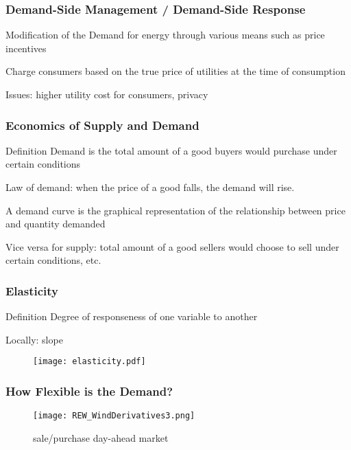 \documentclass[10pt,aspectratio=169,dvipsnames]{beamer}
\begin{document}
\begin{frame}
  \frametitle{Demand-Side Management / Demand-Side Response}

  Modification of the Demand for energy through various means such as price incentives

  Charge consumers based on the true price of utilities at the time of consumption

  Issues: higher utility cost for consumers, privacy

\end{frame}


\begin{frame}
 \frametitle{Economics of Supply and Demand}
 \begin{block}{Definition}
  Demand is the total amount of a good buyers would purchase under certain conditions
 \end{block}

 Law of demand: when the price of a good falls, the demand will rise.

 A demand curve is the graphical representation of the relationship between price and quantity demanded

 Vice versa for supply: total amount of a good sellers would choose to sell under certain conditions, etc.
\end{frame}

\begin{frame}
 \frametitle{Elasticity}
 \begin{block}{Definition}
  Degree of responseness of one variable to another
 \end{block}
 Locally: slope
     \begin{figure}
     \texttt{[image: elasticity.pdf]}
  \end{figure}

\end{frame}


\begin{frame}
 \frametitle{How Flexible is the Demand?}
    \begin{figure}
     \texttt{[image: REW\_WindDerivatives3.png]}
     \caption{sale/purchase day-ahead market}
  \end{figure}
\end{frame}
\end{document}

